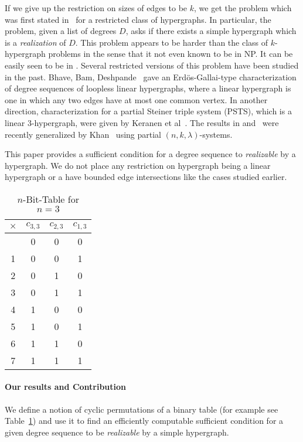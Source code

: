 If we give up the restriction on sizes of edges to be $k$, we get the \hds problem which was first stated in~\cite{berge1984hypergraphs} for a restricted class of hypergraphs. In particular, the \hds problem, given a list of degrees $D$, asks if there exists a simple hypergraph which is a {\em realization} of $D$. This problem appears to be harder than the class of $k$-hypergraph problems in the sense that it not even known to be in {\sf NP}.
It can be easily seen to be in .
Several restricted versions of this problem have been studied in the past.
Bhave, Bam, Deshpande~\cite{bhave200813}
gave an Erd\"os-Gallai-type characterization of degree sequences of loopless linear hypergraphs, where a linear hypergraph is one in which any two edges have at most one common vertex.
In another direction,
characterization for a partial Steiner triple system (PSTS), which is a linear 3-hypergraph, were given by Keranen et al~\cite{keranen2009degree}. The results in \cite{bhave200813} and~\cite{keranen2009degree} were recently generalized by Khan~\cite{} using partial $(n,k,\lambda)$-systems.

This paper provides a sufficient condition for a degree sequence to {\em realizable} by a hypergraph. We do not place any restriction on hypergraph being a linear hypergraph or a have bounded edge intersections like the cases studied earlier.

\begin{table}
\caption{$n$-Bit-Table for $n=3$}
\centering
\begin{tabular}{|c||c|c|c|}
\hline
$\times$ & $c_{3,3}$ & $c_{2,3}$ & $c_{1,3}$\\
\hline
\noalign{\smallskip}
\hline
0 & 0 & 0 & 0\\
1& 0 & 0 & 1\\
2& 0 & 1 & 0\\
3& 0  & 1 & 1\\
4& 1 & 0 & 0\\
5& 1 & 0 & 1\\
6& 1 & 1 & 0\\
7& 1 & 1 & 1\\
\hline
\end{tabular}
\label{table:bitlist3}
\end{table}


\paragraph*{Our results and Contribution}

We define a notion of cyclic permutations of a binary table (for example see Table~\ref{table:bitlist3})
and use it to find an efficiently computable sufficient condition for a given degree sequence to be {\em realizable} by a simple hypergraph.

